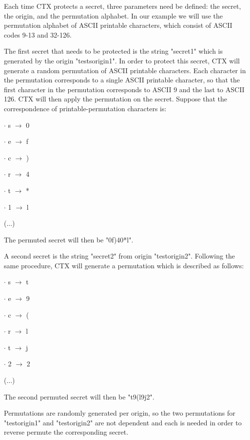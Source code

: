 \documentclass[conference, letterpaper, 10pt]{IEEEtran}
\begin{document}
Each time CTX protects a secret, three parameters need be defined: the secret,
the origin, and the permutation alphabet. In our example we will use the
permutation alphabet of ASCII printable characters, which consist of ASCII codes
9-13 and 32-126.

The first secret that needs to be protected is the string "secret1" which is
generated by the origin "testsorigin1". In order to protect this secret, CTX
will generate a random permutation of ASCII printable characters. Each character
in the permutation corresponds to a single ASCII printable character, so that
the first character in the permutation corresponds to ASCII 9 and the last to
ASCII 126. CTX will then apply the permutation on the secret. Suppose that the
correspondence of printable-permutation characters is:

\begin{description}
    \item{$\cdot$ s} $\rightarrow$ 0
    \item{$\cdot$ e} $\rightarrow$ f
    \item{$\cdot$ c} $\rightarrow$ )
    \item{$\cdot$ r} $\rightarrow$ 4
    \item{$\cdot$ t} $\rightarrow$ *
    \item{$\cdot$ 1} $\rightarrow$ l
    \item (...)
\end{description}

The permuted secret will then be "0f)40*l".

A second secret is the string "secret2" from origin "testorigin2". Following the
same procedure, CTX will generate a permutation which is described as follows:

\begin{description}
    \item{$\cdot$ s} $\rightarrow$ t
    \item{$\cdot$ e} $\rightarrow$ 9
    \item{$\cdot$ c} $\rightarrow$ (
    \item{$\cdot$ r} $\rightarrow$ l
    \item{$\cdot$ t} $\rightarrow$ j
    \item{$\cdot$ 2} $\rightarrow$ 2
    \item (...)
\end{description}

The second permuted secret will then be "t9(l9j2".

Permutations are randomly generated per origin, so the two permutations for
"testorigin1" and "testorigin2" are not dependent and each is needed in order to
reverse permute the corresponding secret.
\end{document}
